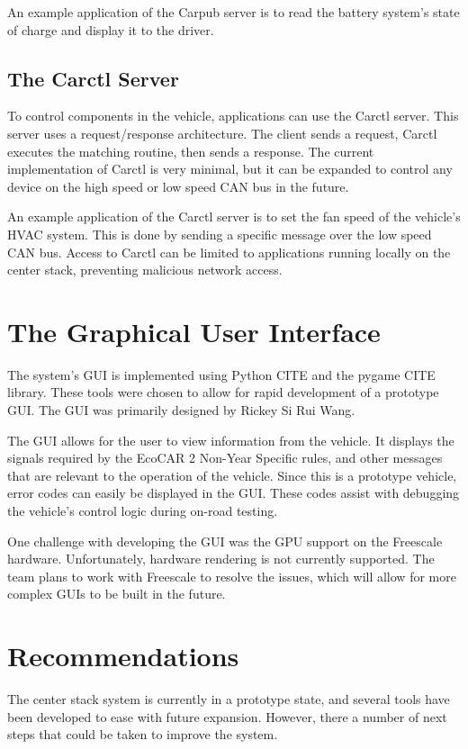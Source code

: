 \documentclass[ece]{uw-wkrpt}
\begin{document}
An example application of the Carpub server is to read the battery system's
state of charge and display it to the driver.

\subsection{The Carctl Server}

To control components in the vehicle, applications can use the Carctl server.
This server uses a request/response architecture. The client sends a request,
Carctl executes the matching routine, then sends a response. The current
implementation of Carctl is very minimal, but it can be expanded to control any
device on the high speed or low speed CAN bus in the future.

An example application of the Carctl server is to set the fan speed of the
vehicle's HVAC system. This is done by sending a specific message over the low
speed CAN bus. Access to Carctl can be limited to applications running locally
on the center stack, preventing malicious network access.

\section{The Graphical User Interface}

The system's GUI is implemented using Python CITE and the pygame CITE library.
These tools were chosen to allow for rapid development of a prototype GUI. The
GUI was primarily designed by Rickey Si Rui Wang.

The GUI allows for the user to view information from the vehicle. It displays
the signals required by the EcoCAR 2 Non-Year Specific rules, and other messages
that are relevant to the operation of the vehicle. Since this is a prototype
vehicle, error codes can easily be displayed in the GUI. These codes assist with
debugging the vehicle's control logic during on-road testing.

One challenge with developing the GUI was the GPU support on the Freescale
hardware. Unfortunately, hardware rendering is not currently supported. The team
plans to work with Freescale to resolve the issues, which will allow for more
complex GUIs to be built in the future.

\section{Recommendations}

The center stack system is currently in a prototype state, and several tools
have been developed to ease with future expansion. However, there a number of
next steps that could be taken to improve the system.
\end{document}
